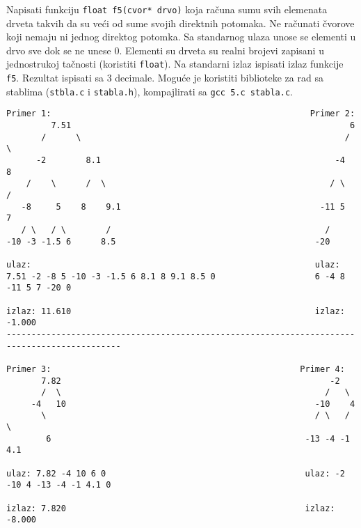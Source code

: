 \begin{z}
Napisati funkciju \verb|float f5(cvor* drvo)| koja ra\v cuna sumu svih elemenata drveta
takvih da su ve\'ci od sume svojih direktnih potomaka. Ne ra\v cunati \v cvorove koji
nemaju ni jednog direktog potomka.
Sa standarnog ulaza unose se elementi u drvo sve dok se ne unese 0.
Elementi su drveta su realni brojevi zapisani u jednostrukoj ta\v cnosti (koristiti \verb|float|).
Na standarni izlaz ispisati izlaz funkcije \verb|f5|. Rezultat ispisati sa 3 decimale.
Mogu\'ce je koristiti biblioteke za rad sa stablima (\verb|stbla.c| i \verb|stabla.h|),
kompajlirati sa \verb|gcc 5.c stabla.c|.
\end{z}
\begin{verbatim}
Primer 1:                                                    Primer 2:
         7.51                                                        6
       /      \                                                     /  \
      -2        8.1                                               -4    8
    /    \      /  \                                             / \   /
   -8     5    8    9.1                                        -11 5   7
   / \   / \        /                                           /
-10 -3 -1.5 6      8.5                                        -20

ulaz:                                                         ulaz:
7.51 -2 -8 5 -10 -3 -1.5 6 8.1 8 9.1 8.5 0                    6 -4 8 -11 5 7 -20 0

izlaz: 11.610                                                 izlaz: -1.000
---------------------------------------------------------------------------------------------

Primer 3:                                                  Primer 4:
       7.82                                                      -2
       /  \                                                     /   \
     -4   10                                                  -10    4
       \                                                      / \   /  \
        6                                                   -13 -4 -1   4.1

ulaz: 7.82 -4 10 6 0                                        ulaz: -2 -10 4 -13 -4 -1 4.1 0

izlaz: 7.820                                                izlaz: -8.000
\end{verbatim}

